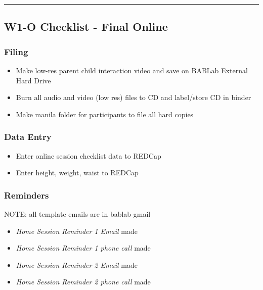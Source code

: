 \documentclass[]{book}
\providecommand{\tightlist}{%
  \setlength{\itemsep}{0pt}\setlength{\parskip}{0pt}}
\begin{document}
\begin{center}\rule{0.5\linewidth}{0.5pt}\end{center}

\hypertarget{w1-o-checklist---final-online}{%
\subsection{W1-O Checklist - Final Online}\label{w1-o-checklist---final-online}}

\hypertarget{filing-3}{%
\subsubsection{Filing}\label{filing-3}}

\begin{itemize}
\tightlist
\item
  Make low-res parent child interaction video and save on BABLab External Hard Drive
\item
  Burn all audio and video (low res) files to CD and label/store CD in binder
\item
  Make manila folder for participants to file all hard copies
\end{itemize}

\hypertarget{data-entry-1}{%
\subsubsection{Data Entry}\label{data-entry-1}}

\begin{itemize}
\tightlist
\item
  Enter online session checklist data to REDCap
\item
  Enter height, weight, waist to REDCap
\end{itemize}

\hypertarget{reminders-2}{%
\subsubsection{Reminders}\label{reminders-2}}

NOTE: all template emails are in bablab gmail

\begin{itemize}
\tightlist
\item
  \emph{Home Session Reminder 1 Email} made
\item
  \emph{Home Session Reminder 1 phone call} made
\item
  \emph{Home Session Reminder 2 Email} made
\item
  \emph{Home Session Reminder 2 phone call} made
\end{itemize}
\end{document}
